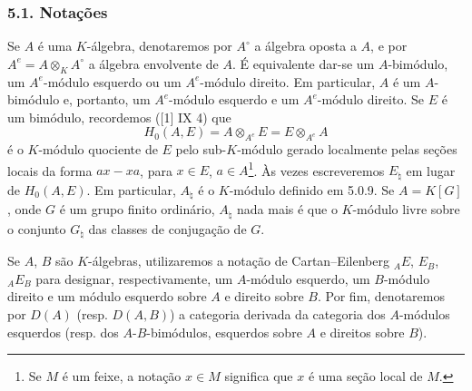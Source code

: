 \subsubsection*{5.1. Notações}

Se $A$ é uma $K$-álgebra, denotaremos por $A^\circ$ a álgebra oposta a $A$, e por $A^e=A\otimes_KA^\circ$ a álgebra envolvente de $A$. É equivalente dar-se um $A$-bimódulo, um $A^e$-módulo esquerdo ou um $A^e$-módulo direito. Em particular, $A$ é um $A$-bimódulo e, portanto, um $A^e$-módulo esquerdo e um $A^e$-módulo direito. Se $E$ é um bimódulo, recordemos ([1] IX 4) que
\[
H_0(A,E)=A\otimes_{A^e}E=E\otimes_{A^e}A
\]
é o $K$-módulo quociente de $E$ pelo sub-$K$-módulo gerado localmente pelas seções locais da forma $ax-xa$, para $x\in E$, $a\in A$\footnote{Se $M$ é um feixe, a notação $x\in M$ significa que $x$ é uma seção local de $M$.}. Às vezes escreveremos $E_\natural$ em lugar de $H_0(A,E)$. Em particular, $A_\natural$ é o $K$-módulo definido em 5.0.9. Se $A=K[G]$, onde $G$ é um grupo finito ordinário, $A_\natural$ nada mais é que o $K$-módulo livre sobre o conjunto $G_\natural$ das classes de conjugação de $G$.

Se $A$, $B$ são $K$-álgebras, utilizaremos a notação de Cartan--Eilenberg ${}_AE$, $E_B$, ${}_AE_B$ para designar, respectivamente, um $A$-módulo esquerdo, um $B$-módulo direito e um módulo esquerdo sobre $A$ e direito sobre $B$. Por fim, denotaremos por $D(A)$ (resp. $D(A,B)$) a categoria derivada da categoria dos $A$-módulos esquerdos (resp. dos $A$-$B$-bimódulos, esquerdos sobre $A$ e direitos sobre $B$).
